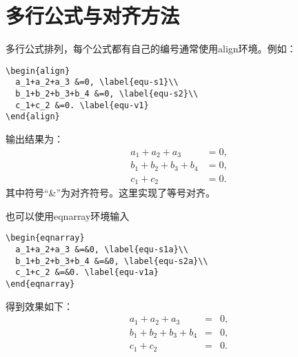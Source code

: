 \section{多行公式与对齐方法}\label{section4-6}
多行公式排列，每个公式都有自己的编号通常使用align环境。例如：
\begin{verbatim}
\begin{align}
  a_1+a_2+a_3 &=0, \label{equ-s1}\\
  b_1+b_2+b_3+b_4 &=0, \label{equ-s2}\\
  c_1+c_2 &=0. \label{equ-v1}
\end{align}
\end{verbatim}
输出结果为：
\begin{align}
  a_1+a_2+a_3 &=0, \label{equ-s1}\\
  b_1+b_2+b_3+b_4 &=0, \label{equ-s2}\\
  c_1+c_2 &=0. \label{equ-v1}
\end{align}
其中符号“\&”为对齐符号。这里实现了等号对齐。

也可以使用eqnarray环境输入
\begin{verbatim}
\begin{eqnarray}
  a_1+a_2+a_3 &=&0, \label{equ-s1a}\\
  b_1+b_2+b_3+b_4 &=&0, \label{equ-s2a}\\
  c_1+c_2 &=&0. \label{equ-v1a}
\end{eqnarray}
\end{verbatim}
得到效果如下：
\begin{eqnarray}
  a_1+a_2+a_3 &=&0, \label{equ-s1a}\\
  b_1+b_2+b_3+b_4 &=&0, \label{equ-s2a}\\
  c_1+c_2 &=&0. \label{equ-v1a}
\end{eqnarray}

